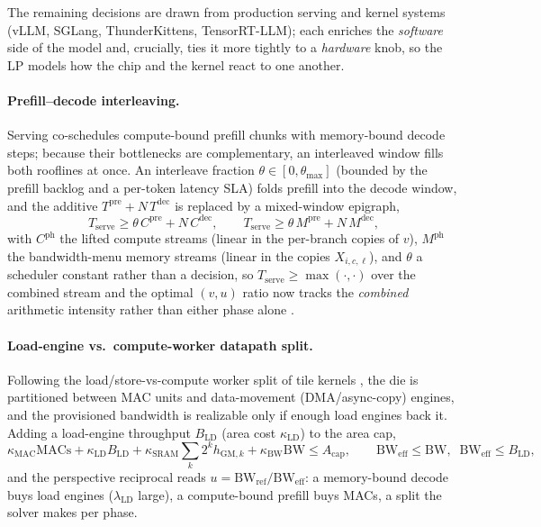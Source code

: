 The remaining decisions are drawn from production serving and kernel systems
(vLLM, SGLang, ThunderKittens, TensorRT-LLM); each enriches the \emph{software}
side of the model and, crucially, ties it more tightly to a \emph{hardware} knob,
so the LP models how the chip and the kernel react to one another.

\paragraph{Prefill--decode interleaving.}
Serving co-schedules compute-bound prefill chunks with memory-bound decode steps;
because their bottlenecks are complementary, an interleaved window fills both
rooflines at once. An interleave fraction $\theta\in[0,\theta_{\max}]$ (bounded by
the prefill backlog and a per-token latency SLA) folds prefill into the decode
window, and the additive $T^{\mathrm{pre}}+N\,T^{\mathrm{dec}}$ is replaced by a
mixed-window epigraph,
\begin{equation}
T_{\mathrm{serve}} \ge \theta\,C^{\mathrm{pre}} + N\,C^{\mathrm{dec}},
\qquad
T_{\mathrm{serve}} \ge \theta\,M^{\mathrm{pre}} + N\,M^{\mathrm{dec}},
\label{eq:v3_interleave}
\end{equation}
with $C^{\mathrm{ph}}$ the lifted compute streams (linear in the per-branch
copies of $v$), $M^{\mathrm{ph}}$ the bandwidth-menu memory streams (linear in
the copies $X_{i,c,\ell}$), and $\theta$ a scheduler constant rather than a
decision, so $T_{\mathrm{serve}}\ge\max(\cdot,\cdot)$ over the combined stream and the optimal
$(v,u)$ ratio now tracks the \emph{combined} arithmetic intensity rather than
either phase alone \citep{kwon2023vllm}.

\paragraph{Load-engine vs.\ compute-worker datapath split.}
Following the load/store-vs-compute worker split of tile kernels
\citep{spector2024thunderkittens}, the die is partitioned between MAC units and
data-movement (DMA/async-copy) engines, and the provisioned bandwidth is
realizable only if enough load engines back it. Adding a load-engine throughput
$B_{\mathrm{LD}}$ (area cost $\kappa_{\mathrm{LD}}$) to the area cap,
\begin{equation}
\kappa_{\mathrm{MAC}}\mathrm{MACs} + \kappa_{\mathrm{LD}}B_{\mathrm{LD}}
 + \kappa_{\mathrm{SRAM}}\!\sum_k 2^k h_{\mathrm{GM},k} + \kappa_{\mathrm{BW}}\mathrm{BW}
 \le A_{\mathrm{cap}},
\qquad
\mathrm{BW}_{\mathrm{eff}} \le \mathrm{BW},\;\; \mathrm{BW}_{\mathrm{eff}} \le B_{\mathrm{LD}},
\label{eq:v3_datapath}
\end{equation}
and the perspective reciprocal reads $u=\mathrm{BW_{ref}}/\mathrm{BW_{eff}}$: a
memory-bound decode buys load engines ($\lambda_{\mathrm{LD}}$ large), a
compute-bound prefill buys MACs, a split the solver makes per phase.

